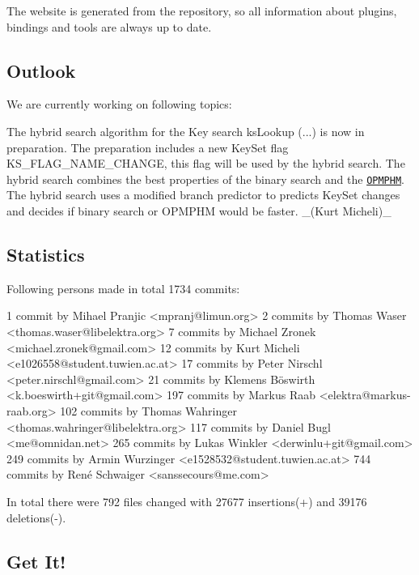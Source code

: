 The website is generated from the repository, so all information about plugins, bindings and tools are always up to date.

\subsection*{Outlook}

We are currently working on following topics\+:


\begin{DoxyItemize}
\item The hybrid search algorithm for the Key search {\ttfamily ks\+Lookup (...)} is now in preparation. The preparation includes a new Key\+Set flag {\ttfamily K\+S\+\_\+\+F\+L\+A\+G\+\_\+\+N\+A\+M\+E\+\_\+\+C\+H\+A\+N\+GE}, this flag will be used by the hybrid search. The hybrid search combines the best properties of the binary search and the \href{https://master.libelektra.org/doc/dev/data-structures.md#order-preserving-minimal-perfect-hash-map-aka-opmphm}{\tt O\+P\+M\+P\+HM}. The hybrid search uses a modified branch predictor to predicts Key\+Set changes and decides if binary search or O\+P\+M\+P\+HM would be faster. \+\_\+(\+Kurt Micheli)\+\_\+
\end{DoxyItemize}

\subsection*{Statistics}

Following persons made in total 1734 commits\+: \begin{DoxyVerb}  1 commit  by Mihael Pranjic <mpranj@limun.org>
  2 commits by Thomas Waser <thomas.waser@libelektra.org>
  7 commits by Michael Zronek <michael.zronek@gmail.com>
 12 commits by Kurt Micheli <e1026558@student.tuwien.ac.at>
 17 commits by Peter Nirschl <peter.nirschl@gmail.com>
 21 commits by Klemens Böswirth <k.boeswirth+git@gmail.com>
197 commits by Markus Raab <elektra@markus-raab.org>
102 commits by Thomas Wahringer <thomas.wahringer@libelektra.org>
117 commits by Daniel Bugl <me@omnidan.net>
265 commits by Lukas Winkler <derwinlu+git@gmail.com>
249 commits by Armin Wurzinger <e1528532@student.tuwien.ac.at>
744 commits by René Schwaiger <sanssecours@me.com>
\end{DoxyVerb}


In total there were 792 files changed with 27677 insertions(+) and 39176 deletions(-\/).

\subsection*{Get It!}


